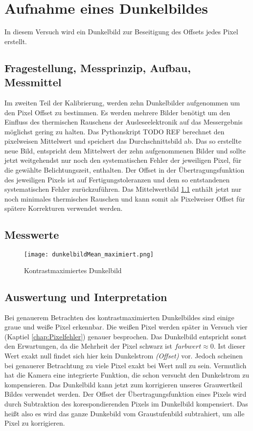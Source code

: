 %
%
\chapter{Aufnahme eines Dunkelbildes}
In diesem Versuch wird ein Dunkelbild zur Beseitigung des Offsets jedes Pixel erstellt.
\label{chap:Aufnahme_eines_Dunkelbildes}

\section{Fragestellung, Messprinzip, Aufbau, Messmittel}
Im zweiten Teil der Kalibrierung, werden zehn Dunkelbilder aufgenommen um den Pixel Offset zu bestimmen. Es werden mehrere Bilder benötigt um den Einfluss des thermischen Rauschens der Ausleseelektronik auf das Messergebnis möglichst gering zu halten. Das Pythonskript TODO REF berechnet den pixelweisen Mittelwert und speichert das Durchschnittsbild ab. Das so erstellte neue Bild, entspricht dem Mittelwert der zehn aufgenommenen Bilder und sollte jetzt weitgehendst nur noch den systematischen Fehler der jeweiligen Pixel, für die gewählte Belichtungszeit, enthalten. Der Offset in der Übertragungsfunktion des jeweiligen Pixels ist auf Fertigungstoleranzen und dem so entstandenen systematischen Fehler zurückzuführen. Das Mittelwertbild \ref{img:dunkelbild_kontrastmax} enthält jetzt nur noch minimales thermisches Rauschen und kann somit als Pixelweiser Offset für spätere Korrekturen verwendet werden.
\label{chap:VERSUCH_2_FRAGESTELLUNG}

\section{Messwerte}
\begin{figure}[H]
\centering
\texttt{[image: dunkelbildMean\_maximiert.png]}
\caption{Kontrastmaximiertes Dunkelbild}
\label{img:dunkelbild_kontrastmax}
\end{figure}
\label{chap:VERSUCH_2_MESSWERTE}

\section{Auswertung und Interpretation}
\label{chap:VERSUCH_2_AUSWERTUNG}
Bei genauerem Betrachten des kontrastmaximierten Dunkelbildes sind einige graue und weiße Pixel erkennbar. Die weißen Pixel werden später in Versuch vier (Kaptiel \ref{chap:Pixelfehler}) genauer besprochen.
Das Dunkelbild entspricht sonst den Erwartungen, da die Mehrheit der Pixel schwarz ist $farbwert \approx 0$. Ist dieser Wert exakt null findet sich hier kein Dunkelstrom \textit{(Offset)} vor. Jedoch scheinen bei genauerer Betrachtung zu viele Pixel exakt bei Wert null zu sein. Vermutlich hat die Kamera eine integrierte Funktion, die schon versucht den Dunkelstrom zu kompensieren.
Das Dunkelbild kann jetzt zum korrigieren unseres Grauwertkeil Bildes verwendet werden. Der Offset der Übertragungsfunktion eines Pixels wird durch Subtraktion des korespondierenden Pixels im Dunkelbild kompensiert. Das heißt also es wird das ganze Dunkebild vom Graustufenbild subtrahiert, um alle Pixel zu korrigieren.
